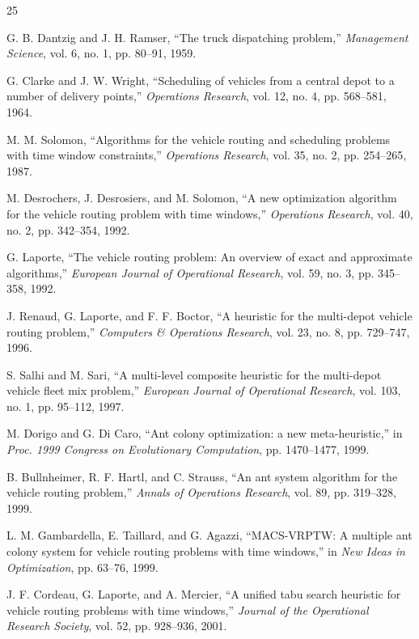 \documentclass[10pt,conference]{IEEEtran}
\begin{document}
\begin{thebibliography}{25}

 G. B. Dantzig and J. H. Ramser, ``The truck dispatching problem,'' \textit{Management Science}, vol. 6, no. 1, pp. 80--91, 1959.

 G. Clarke and J. W. Wright, ``Scheduling of vehicles from a central depot to a number of delivery points,'' \textit{Operations Research}, vol. 12, no. 4, pp. 568--581, 1964.

 M. M. Solomon, ``Algorithms for the vehicle routing and scheduling problems with time window constraints,'' \textit{Operations Research}, vol. 35, no. 2, pp. 254--265, 1987.

 M. Desrochers, J. Desrosiers, and M. Solomon, ``A new optimization algorithm for the vehicle routing problem with time windows,'' \textit{Operations Research}, vol. 40, no. 2, pp. 342--354, 1992.

 G. Laporte, ``The vehicle routing problem: An overview of exact and approximate algorithms,'' \textit{European Journal of Operational Research}, vol. 59, no. 3, pp. 345--358, 1992.

 J. Renaud, G. Laporte, and F. F. Boctor, ``A heuristic for the multi-depot vehicle routing problem,'' \textit{Computers \& Operations Research}, vol. 23, no. 8, pp. 729--747, 1996.

 S. Salhi and M. Sari, ``A multi-level composite heuristic for the multi-depot vehicle fleet mix problem,'' \textit{European Journal of Operational Research}, vol. 103, no. 1, pp. 95--112, 1997.

 M. Dorigo and G. Di Caro, ``Ant colony optimization: a new meta-heuristic,'' in \textit{Proc. 1999 Congress on Evolutionary Computation}, pp. 1470--1477, 1999.

 B. Bullnheimer, R. F. Hartl, and C. Strauss, ``An ant system algorithm for the vehicle routing problem,'' \textit{Annals of Operations Research}, vol. 89, pp. 319--328, 1999.

 L. M. Gambardella, E. Taillard, and G. Agazzi, ``MACS-VRPTW: A multiple ant colony system for vehicle routing problems with time windows,'' in \textit{New Ideas in Optimization}, pp. 63--76, 1999.

 J. F. Cordeau, G. Laporte, and A. Mercier, ``A unified tabu search heuristic for vehicle routing problems with time windows,'' \textit{Journal of the Operational Research Society}, vol. 52, pp. 928--936, 2001.


\end{thebibliography}
\end{document}
